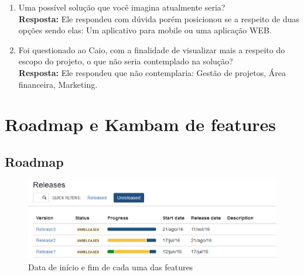 \begin{anexosenv}
\begin{enumerate}
    \item Uma possível solução que você imagina atualmente seria?\\
    \newline
    \textbf{Resposta:} Ele respondeu com dúvida porém posicionou se a respeito de duas opções  sendo elas: Um aplicativo para mobile ou uma aplicação WEB. 

    \item Foi questionado ao Caio, com a finalidade de visualizar mais a respeito do escopo do projeto, o que não seria contemplado na solução?\\
    \newline
    \textbf{Resposta:} Ele respondeu que não contemplaria: Gestão de projetos, Área financeira, Marketing.
\end{enumerate}

\chapter[Roadmap e Kambam de features]{Roadmap e Kambam de features}\label{rmkbft}

\section{Roadmap}

\begin{figure}[H]
    \centering
    \includegraphics[keepaspectratio=true,scale=0.5]{figuras/roadmapft.eps}
    \caption[Roadmap de features]{Data de início e fim de cada uma das features}
\end{figure}


\end{anexosenv}
